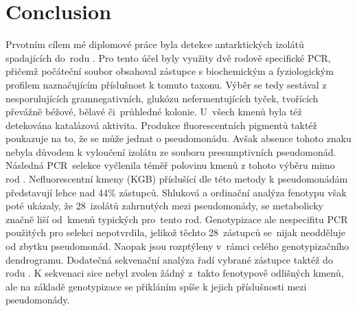 \chapter*{Conclusion}
\shorthandoff{-}

Prvotním cílem mé diplomové práce byla detekce antarktických izolátů spadajících do~rodu .
Pro tento účel byly využity dvě rodově specifické PCR, přičemž počáteční soubor obsahoval zástupce s biochemickým a fyziologickým profilem naznačujícím příslušnost k tomuto taxonu.
Výběr se tedy sestával z nesporulujících gramnegativních, glukózu nefermentujících tyček, tvořících převážně béžové, bělavé či~průhledné kolonie.
U~všech kmenů byla též detekována katalázová aktivita.
Produkce fluorescentních pigmentů taktéž poukazuje na to, že se může jednat o pseudomonádu.
Avšak absence tohoto znaku nebyla důvodem k vyloučení izolátu ze souboru presumptivních pseudomonád.
Následná PCR~selekce vyčlenila téměř polovinu kmenů z tohoto výběru mimo rod .
Nefluorescentní kmeny (KGB) příslušící dle této metody k pseudomonádám představují lehce nad 44\% zástupců.
Shluková a ordinační analýza fenotypu však poté ukázaly, že 28~izolátů zahrnutých mezi pseudomonády, se metabolicky značně liší od~kmenů typických pro~tento rod.
Genotypizace ale nespecifitu PCR použitých pro selekci nepotvrdila, jelikož těchto 28~zástupců se~nijak neodděluje od zbytku pseudomonád.
Naopak jsou rozptýleny v~rámci celého genotypizačního dendrogramu.
Dodatečná sekvenační analýza řadí vybrané zástupce taktéž do rodu .
K sekvenaci sice nebyl zvolen žádný z~takto fenotypově odlišných kmenů, ale na základě genotypizace se přikláním spíše k jejich příslušnosti mezi pseudomonády.

